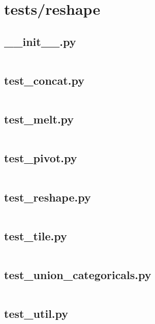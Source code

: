 \documentclass{article}
\begin{document}
\section{tests/reshape}

\subsection{\_\_init\_\_.py}
\inputminted{python}{/home/dufferzafar/dev/@clones/pandas/pandas/tests/reshape/__init__.py}
\newpage

\subsection{test\_concat.py}
\inputminted{python}{/home/dufferzafar/dev/@clones/pandas/pandas/tests/reshape/test_concat.py}
\newpage

\subsection{test\_melt.py}
\inputminted{python}{/home/dufferzafar/dev/@clones/pandas/pandas/tests/reshape/test_melt.py}
\newpage

\subsection{test\_pivot.py}
\inputminted{python}{/home/dufferzafar/dev/@clones/pandas/pandas/tests/reshape/test_pivot.py}
\newpage

\subsection{test\_reshape.py}
\inputminted{python}{/home/dufferzafar/dev/@clones/pandas/pandas/tests/reshape/test_reshape.py}
\newpage

\subsection{test\_tile.py}
\inputminted{python}{/home/dufferzafar/dev/@clones/pandas/pandas/tests/reshape/test_tile.py}
\newpage

\subsection{test\_union\_categoricals.py}
\inputminted{python}{/home/dufferzafar/dev/@clones/pandas/pandas/tests/reshape/test_union_categoricals.py}
\newpage

\subsection{test\_util.py}
\inputminted{python}{/home/dufferzafar/dev/@clones/pandas/pandas/tests/reshape/test_util.py}
\newpage
\end{document}
